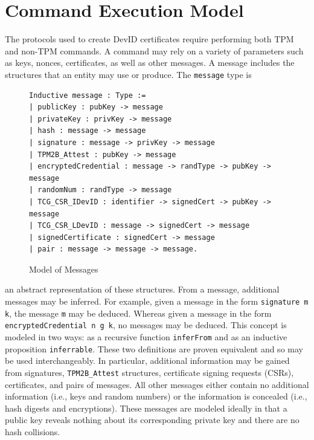 \documentclass[runningheads]{llncs}
\begin{document}
%
%
%
\section{Command Execution Model}
The protocols used to create DevID certificates require performing both TPM and non-TPM commands. A command may rely on a variety of parameters such as keys, nonces, certificates, as well as other messages. A message includes the structures that an entity may use or produce. The \verb|message| type is 
\begin{figure}[h]
\begin{lstlisting}[language=Coq]
Inductive message : Type :=
| publicKey : pubKey -> message
| privateKey : privKey -> message
| hash : message -> message
| signature : message -> privKey -> message
| TPM2B_Attest : pubKey -> message
| encryptedCredential : message -> randType -> pubKey -> message
| randomNum : randType -> message
| TCG_CSR_IDevID : identifier -> signedCert -> pubKey -> message
| TCG_CSR_LDevID : message -> signedCert -> message
| signedCertificate : signedCert -> message
| pair : message -> message -> message.
\end{lstlisting}
\caption{Model of Messages}
\end{figure}
an abstract representation of these structures. From a message, additional messages may be inferred. For example, given a message in the form \verb|signature m k|, the message \verb|m| may be deduced. Whereas given a message in the form \verb|encryptedCredential n g k|, no messages may be deduced. This concept is modeled in two ways: as a recursive function \verb|inferFrom| and as an inductive proposition \verb|inferrable|. These two definitions are proven equivalent and so may be used interchangeably. In particular, additional information may be gained from signatures, \verb|TPM2B_Attest| structures, certificate signing requests (CSRs), certificates, and pairs of messages. All other messages either contain no additional information (i.e., keys and random numbers) or the information is concealed (i.e., hash digests and encryptions). These messages are modeled ideally in that a public key reveals nothing about its corresponding private key and there are no hash collisions.
\end{document}

